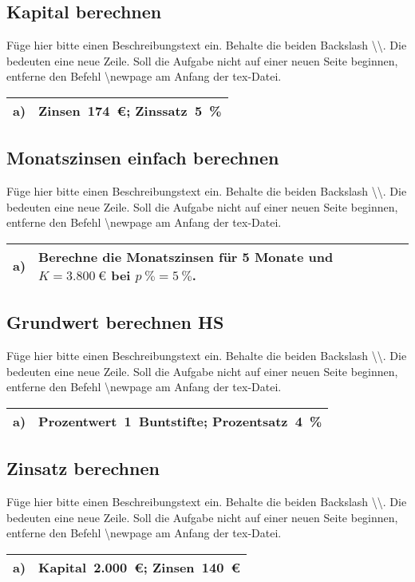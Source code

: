 \subsection{Kapital berechnen}
Füge hier bitte einen Beschreibungstext ein. Behalte die beiden Backslash \textbackslash\textbackslash. Die bedeuten eine neue Zeile. Soll die Aufgabe nicht auf einer neuen Seite beginnen, entferne den Befehl \textbackslash newpage am Anfang der tex-Datei.\\
\begin{xltabular}{\textwidth}{|C{0.75cm}|X|}
\hline
a)&Zinsen~174~€;  Zinssatz~5~\%
\\\hline
\end{xltabular}
\vspace{0.5cm}
\subsection{Monatszinsen einfach berechnen}
Füge hier bitte einen Beschreibungstext ein. Behalte die beiden Backslash \textbackslash\textbackslash. Die bedeuten eine neue Zeile. Soll die Aufgabe nicht auf einer neuen Seite beginnen, entferne den Befehl \textbackslash newpage am Anfang der tex-Datei.\\
\begin{xltabular}{\textwidth}{|C{0.75cm}|X|}
\hline
a)&Berechne die Monatszinsen für 5 Monate und $K=3.800~€$ bei $p~\%=5~\%$.
\\\hline
\end{xltabular}
\vspace{0.5cm}
\subsection{Grundwert berechnen HS}
Füge hier bitte einen Beschreibungstext ein. Behalte die beiden Backslash \textbackslash\textbackslash. Die bedeuten eine neue Zeile. Soll die Aufgabe nicht auf einer neuen Seite beginnen, entferne den Befehl \textbackslash newpage am Anfang der tex-Datei.\\
\begin{xltabular}{\textwidth}{|C{0.75cm}|X|}
\hline
a)&Prozentwert~1~Buntstifte;  Prozentsatz~4~\%
\\\hline
\end{xltabular}
\vspace{0.5cm}
\subsection{Zinsatz berechnen}
Füge hier bitte einen Beschreibungstext ein. Behalte die beiden Backslash \textbackslash\textbackslash. Die bedeuten eine neue Zeile. Soll die Aufgabe nicht auf einer neuen Seite beginnen, entferne den Befehl \textbackslash newpage am Anfang der tex-Datei.\\
\begin{xltabular}{\textwidth}{|C{0.75cm}|X|}
\hline
a)&Kapital~2.000~€;  Zinsen~140~€
\\\hline
\end{xltabular}
\vspace{0.5cm}
